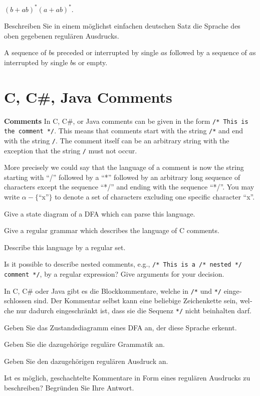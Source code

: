 \documentclass[a4paper]{exam}
\theoremstyle{remark}
\begin{document}
\begin{questions}
	$(b + ab)^*(a + ab)^*$.

\begin{otherlanguage}{german}
	Beschreiben Sie in einem möglichst einfachen deutschen Satz die Sprache des oben gegebenen regulären Ausdrucks.
\end{otherlanguage}

\begin{solution}
A sequence of $b$s preceded or interrupted by single $a$s followed by a sequence of $a$s interrupted by single $b$s or empty.
\end{solution}

\section{C, C\#, Java Comments}
\question
	\textbf{Comments}
		In C, C\#, or Java comments can be given in the form {\tt /* This is the comment */}. This means that comments start
		with the string {\tt /*} and end with the string {\tt */}. The comment itself can be an arbitrary string with the exception that
		the string {\tt */} must not occur.
		
		More precisely we could say that the language of a comment is now the string starting with ``/'' followed by a ``*'' followed by an arbitrary long sequence of characters except the sequence ``*/'' and ending with the sequence ``*/''. You may write $\alpha - \{$``x''$\}$ to denote a set of characters excluding one specific character ``x''.
		
\begin{parts}
	\item Give a state diagram of a DFA which can parse this language.
	\item Give a regular grammar which describes the language of C comments.
	\item Describe this language by a regular set.
	\item Is it possible to describe nested comments, e.g., {\tt /* This is a /* nested */ comment */}, by a regular expression? Give arguments for your decision.
\end{parts}
		
\begin{otherlanguage}{german}
In C, C\# oder Java gibt es die Blockkommentare, welche in \verb$/*$ und \verb$*/$ eingeschlossen sind. Der Kommentar selbst kann eine beliebige Zeichenkette sein, welche nur dadurch eingeschränkt ist, dass sie die Sequenz \verb$*/$ nicht beinhalten darf.

\begin{parts}
	\item Geben Sie das Zustandsdiagramm eines DFA an, der diese Sprache erkennt.
	\item Geben Sie die dazugehörige reguläre Grammatik an.
	\item Geben Sie den dazugehörigen regulären Ausdruck an.
	\item Ist es möglich, geschachtelte Kommentare in Form eines regulären Ausdrucks zu beschreiben? Begründen Sie Ihre Antwort.
\end{parts}


\end{otherlanguage}
\end{questions}
\end{document}
